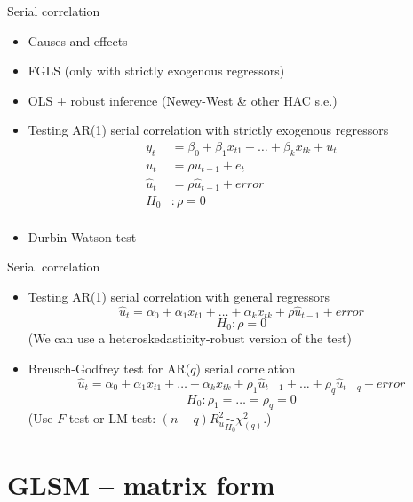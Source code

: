 \documentclass{beamer}
\begin{document}
\begin{frame}{Serial correlation}
\begin{itemize}
\item Causes and effects
\item FGLS (only with strictly exogenous regressors)
\item OLS + robust inference (Newey-West \& other HAC s.e.)
\vspace{0.6cm}
\item Testing AR(1) serial correlation with strictly exogenous regressors
\begin{align}\nonumber
y_t & = \beta_0+\beta_1 x_{t1}+\dots+\beta_k x_{tk}+u_t \\ \nonumber
u_t & = \rho u_{t-1} + e_t \\ \nonumber
\hat{u}_t &= \rho \hat{u}_{t-1}+error \\ \nonumber
H_0 & : \rho=0\\\nonumber
\end{align}
\item Durbin-Watson test
\end{itemize}
\end{frame}


\begin{frame}{Serial correlation}
\begin{itemize}
\item Testing AR(1) serial correlation with general regressors
$$\hat{u}_t=\alpha_0+\alpha_1 x_{t1} + \dots + \alpha_k x_{tk} + \rho \hat{u}_{t-1} + \textit{error}$$
$$H_0 : \rho = 0$$
(We can use a heteroskedasticity-robust version of the test)

\vspace{0.5cm}

\item Breusch-Godfrey test for AR($q$) serial correlation
$$\hat{u}_t=\alpha_0+\alpha_1 x_{t1} + \dots + \alpha_k x_{tk} + \rho_1 \hat{u}_{t-1} +\dots+ \rho_q \hat{u}_{t-q}+\textit{error}  $$
$$H_0 : \rho_1 = \dots = \rho_q = 0$$
(Use $F$-test \quad or \quad LM-test: $(n-q)R_u^2 \underset{H_0}{\sim} \chi^2_{(q)}$.)
\end{itemize}
\end{frame}


\section{GLSM – matrix form}
\end{document}
